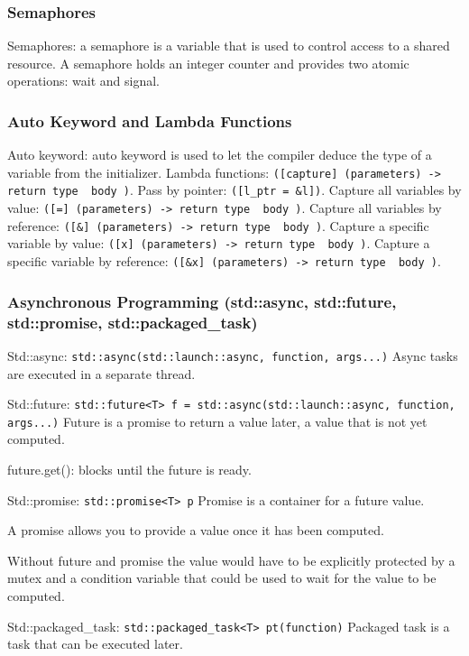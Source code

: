 \documentclass{article}
\begin{document}
\subsubsection*{Semaphores}
Semaphores: a semaphore is a variable that is used to control access to a shared resource.
A semaphore holds an integer counter and provides two atomic operations: wait and signal.

\subsubsection*{Auto Keyword and Lambda Functions}
Auto keyword: auto keyword is used to let the compiler deduce the type of a variable from the initializer.
Lambda functions: \texttt{([capture] (parameters) -> return type { body })}.
Pass by pointer: \texttt{([l\_ptr = \&l])}.
Capture all variables by value: \texttt{([=] (parameters) -> return type { body })}.
Capture all variables by reference: \texttt{([\&] (parameters) -> return type { body })}.
Capture a specific variable by value: \texttt{([x] (parameters) -> return type { body })}.
Capture a specific variable by reference: \texttt{([\&x] (parameters) -> return type { body })}.

\subsubsection*{Asynchronous Programming (std::async, std::future, std::promise, std::packaged\_task)}
Std::async: \texttt{std::async(std::launch::async, function, args...)}
Async tasks are executed in a separate thread.

Std::future: \texttt{std::future<T> f = std::async(std::launch::async, function, args...)}
Future is a promise to return a value later, a value that is not yet computed.

future.get(): blocks until the future is ready.

Std::promise: \texttt{std::promise<T> p}
Promise is a container for a future value.

A promise allows you to provide a value once it has been computed.

Without future and promise the value would have to be explicitly protected by a
mutex and a condition variable that could be used to wait for the value to be computed.

Std::packaged\_task: \texttt{std::packaged\_task<T> pt(function)}
Packaged task is a task that can be executed later.
\end{document}

